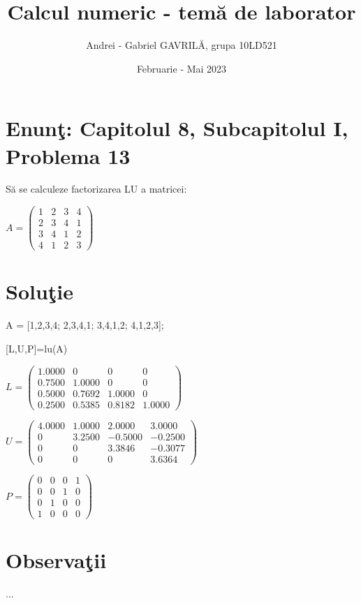 \documentclass{article}
\begin{document}
\title{Calcul numeric - tem\u{a} de laborator}

\author{Andrei - Gabriel GAVRIL\u{A}, grupa 10LD521}

\date{Februarie - Mai 2023}

\maketitle

\section*{Enun\c{t}: Capitolul 8, Subcapitolul I, Problema 13}

S\u{a} se calculeze factorizarea LU a matricei:
\begin{center}
$
A=\begin{pmatrix}
1 & 2 & 3 & 4\\
2 & 3 & 4 & 1\\
3 & 4 & 1 & 2\\
4 & 1 & 2 & 3
\end{pmatrix}
$
\end{center}

\section*{Solu\c{t}ie}

\begin{center}
    A = [1,2,3,4; 2,3,4,1; 3,4,1,2; 4,1,2,3];
\end{center}
\begin{center}
    [L,U,P]=lu(A)
\end{center}

\begin{center}
$
L =\begin{pmatrix}

    1.0000  &       0  &       0  &       0\\
    0.7500  &  1.0000  &       0  &       0\\
    0.5000  &  0.7692  &  1.0000  &       0\\
    0.2500  &  0.5385  &  0.8182  &  1.0000
\end{pmatrix}
$
\end{center}

\begin{center}
$
U =\begin{pmatrix}
  4.0000  &  1.0000  &  2.0000  &  3.0000\\
    0  &  3.2500  & -0.5000 &  -0.2500\\
    0  & 0  &  3.3846  & -0.3077\\
    0  & 0  &  0  &  3.6364
\end{pmatrix}
$
\end{center} 

\begin{center}
$
P =\begin{pmatrix}
  0  &   0  &   0   & 1\\
  0  &   0  &   1   &  0\\
  0  &   1  &   0   &  0\\
  1  &   0  &   0   &  0
\end{pmatrix}
$
\end{center}
    

\section*{Observa\c{t}ii}

...
\end{document}
